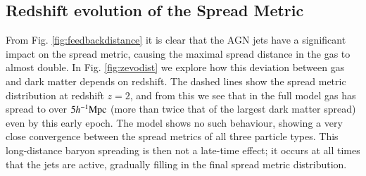 \subsection{Redshift evolution of the Spread Metric}


From Fig. \ref{fig:feedbackdistance} it is clear that the AGN jets have a
significant impact on the spread metric, causing the maximal spread distance
in the gas to almost double. In Fig. \ref{fig:zevodist} we explore how this
deviation between gas and dark matter depends on redshift. The dashed lines
show the spread metric distribution at redshift $z=2$, and from this we see
that in the full model gas has spread to over $5h^{-1}{\rm Mpc}{}$ (more than twice
that of the largest dark matter spread) even by this early epoch. The
\nojet{} model shows no such behaviour, showing a very close convergence
between the spread metrics of all three particle types. This long-distance
baryon spreading is then not a late-time effect; it occurs at all times that
the jets are active, gradually filling in the final spread metric
distribution.